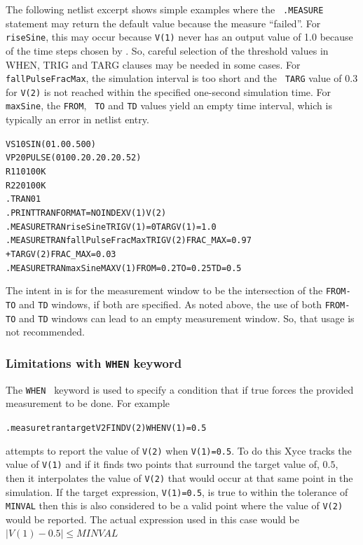 The following netlist excerpt shows simple examples where the {\tt
.MEASURE} statement may return the default value because the measure
``failed''.  For {\tt riseSine}, this may occur because {\tt V(1)}
never has an output value of 1.0 because of the time steps chosen
by \Xyce{}. So, careful selection of the threshold values in WHEN,
TRIG and TARG clauses may be needed in some cases.  For {\tt
fallPulseFracMax}, the simulation interval is too short and the {\tt
TARG} value of 0.3 for {\tt V(2)} is not reached within the specified
one-second simulation time.  For {\tt maxSine}, the {\tt FROM}, {\tt
TO} and {\tt TD} values yield an empty time interval, which is
typically an error in netlist entry.
\begin{alltt}
VS  1  0  SIN(0 1.0 0.5 0 0)
VP  2  0  PULSE( 0 10 0.2 0.2 0.2 0.5 2)
R1  1  0  100K
R2  2  0  100K
.TRAN 0  1
.PRINT TRAN FORMAT=NOINDEX V(1) V(2)
.MEASURE TRAN riseSine TRIG V(1)=0 TARG V(1)=1.0
.MEASURE TRAN fallPulseFracMax TRIG V(2) FRAC_MAX=0.97
+ TARG V(2) FRAC_MAX=0.03
.MEASURE TRAN maxSine MAX V(1) FROM=0.2 TO=0.25 TD=0.5
\end{alltt}
The intent in \Xyce{} is for the measurement window to be the
intersection of the {\tt FROM-TO} and {\tt TD} windows, if both are
specified.  As noted above, the use of both {\tt FROM-TO} and {\tt TD}
windows can lead to an empty measurement window.  So, that usage is
not recommended.

\subsubsection{Limitations with \texttt{WHEN} keyword}
\label{Limitations_WHEN}

The \texttt{WHEN } keyword is used to specify a condition that if true 
forces the provided measurement to be done.  For example
\begin{alltt}
.measure tran targetV2 FIND V(2) WHEN V(1)=0.5
\end{alltt}
attempts to report the value of \texttt{V(2)} when \texttt{V(1)=0.5}.
To do this Xyce tracks the value of \texttt{V(1)} and if it finds 
two points that surround the target value of, $0.5$, then it interpolates
the value of \texttt{V(2)} that would occur at that same point in the
simulation.  If the target expression, \texttt{V(1)=0.5}, is true to 
within the tolerance of \texttt{MINVAL} then this is also considered 
to be a valid point where the value of \texttt{V(2)} would be reported.  The
actual expression used in this case would be $|V(1)-0.5| \leq MINVAL$

